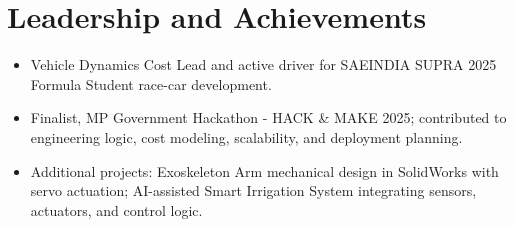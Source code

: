 \documentclass[9pt,a4paper]{extarticle}
\begin{document}
\section*{Leadership and Achievements}
\begin{itemize}
    \item Vehicle Dynamics Cost Lead and active driver for SAEINDIA SUPRA 2025 Formula Student race-car development.
    \item Finalist, MP Government Hackathon - HACK \& MAKE 2025; contributed to engineering logic, cost modeling, scalability, and deployment planning.
    \item Additional projects: Exoskeleton Arm mechanical design in SolidWorks with servo actuation; AI-assisted Smart Irrigation System integrating sensors, actuators, and control logic.
\end{itemize}
\end{document}
